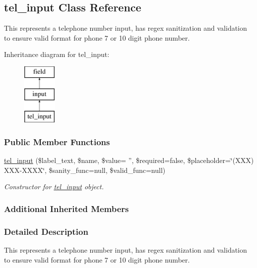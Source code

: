 \hypertarget{classtel__input}{\subsection{tel\-\_\-input Class Reference}
\label{classtel__input}
}


This represents a telephone number input, has regex sanitization and validation to ensure valid format for phone 7 or 10 digit phone number.  


Inheritance diagram for tel\-\_\-input\-:\begin{figure}[H]
\begin{center}
\leavevmode
\includegraphics[height=3.000000cm]{classtel__input}
\end{center}
\end{figure}
\subsubsection*{Public Member Functions}
\begin{DoxyCompactItemize}
\item 
\hyperlink{classtel__input_a04c124f93d2a9c3339567228f31bd0b9}{tel\-\_\-input} (\$label\-\_\-text, \$name, \$value= '', \$required=false, \$placeholder=\char`\"{}(X\-X\-X) X\-X\-X-\/X\-X\-X\-X\char`\"{}, \$sanity\-\_\-func=null, \$valid\-\_\-func=null)
\begin{DoxyCompactList}\small\item\em Constructor for \hyperlink{classtel__input}{tel\-\_\-input} object. \end{DoxyCompactList}\end{DoxyCompactItemize}
\subsubsection*{Additional Inherited Members}


\subsubsection{Detailed Description}
This represents a telephone number input, has regex sanitization and validation to ensure valid format for phone 7 or 10 digit phone number. 


